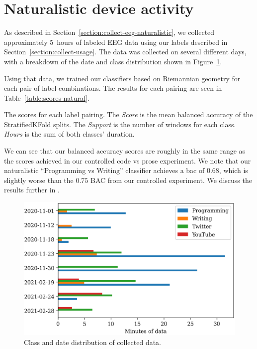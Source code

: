     \section{Naturalistic device activity}

        As described in Section~\ref{section:collect-eeg-naturalistic}, we collected approximately \SI{5}{hours} of labeled EEG data using our labels described in Section~\ref{section:collect-usage}. The data was collected on several different days, with a breakdown of the date and class distribution shown in Figure~\ref{figure:dayclass-dist}. 

        Using that data, we trained our classifiers based on Riemannian geometry for each pair of label combinations. The results for each pairing are seen in Table~\ref{table:scores-natural}.


        \begin{table}[h]
            \centering
            
            \caption{The scores for each label pairing. The \textit{Score} is the mean balanced accuracy of the StratifiedKFold splits. The \textit{Support} is the number of windows for each class. \textit{Hours} is the sum of both classes' duration.}\label{table:scores-natural}
        \end{table}

        We can see that our balanced accuracy scores are roughly in the same range as the scores achieved in our controlled code vs prose experiment. We note that our naturalistic ``Programming vs Writing'' classifier achieves a \gls{bac} of 0.68, which is slightly worse than the $0.75$ BAC from our controlled experiment. We discuss the results further in .

        \begin{figure}[h]
            \centering
            \includegraphics[width=12cm]{img/naturalistic-dayclass-dist.png}
            \caption{Class and date distribution of collected data.}\label{figure:dayclass-dist}
        \end{figure}

        \vfill
